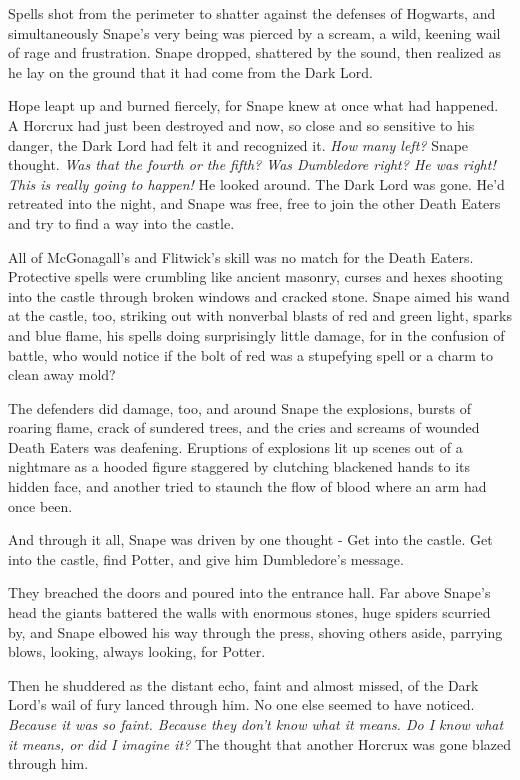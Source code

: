 \documentclass[a4paper,11pt]{article}
\begin{document}
Spells shot from the perimeter to shatter against the defenses of Hogwarts, and simultaneously Snape's very being was pierced by a scream, a wild, keening wail of rage and frustration. Snape dropped, shattered by the sound, then realized as he lay on the ground that it had come from the Dark Lord.

Hope leapt up and burned fiercely, for Snape knew at once what had happened. A Horcrux had just been destroyed and now, so close and so sensitive to his danger, the Dark Lord had felt it and recognized it. \emph{How many left?} Snape thought. \emph{Was that the fourth or the fifth? Was Dumbledore right? He was right! This is really going to happen!} He looked around. The Dark Lord was gone. He'd retreated into the night, and Snape was free, free to join the other Death Eaters and try to find a way into the castle.

All of McGonagall's and Flitwick's skill was no match for the Death Eaters. Protective spells were crumbling like ancient masonry, curses and hexes shooting into the castle through broken windows and cracked stone. Snape aimed his wand at the castle, too, striking out with nonverbal blasts of red and green light, sparks and blue flame, his spells doing surprisingly little damage, for in the confusion of battle, who would notice if the bolt of red was a stupefying spell or a charm to clean away mold?

The defenders did damage, too, and around Snape the explosions, bursts of roaring flame, crack of sundered trees, and the cries and screams of wounded Death Eaters was deafening. Eruptions of explosions lit up scenes out of a nightmare as a hooded figure staggered by clutching blackened hands to its hidden face, and another tried to staunch the flow of blood where an arm had once been.

And through it all, Snape was driven by one thought - Get into the castle. Get into the castle, find Potter, and give him Dumbledore's message.

They breached the doors and poured into the entrance hall. Far above Snape's head the giants battered the walls with enormous stones, huge spiders scurried by, and Snape elbowed his way through the press, shoving others aside, parrying blows, looking, always looking, for Potter.

Then he shuddered as the distant echo, faint and almost missed, of the Dark Lord's wail of fury lanced through him. No one else seemed to have noticed. \emph{Because it was so faint. Because they don't know what it means. Do I know what it means, or did I imagine it?} The thought that another Horcrux was gone blazed through him.
\end{document}
